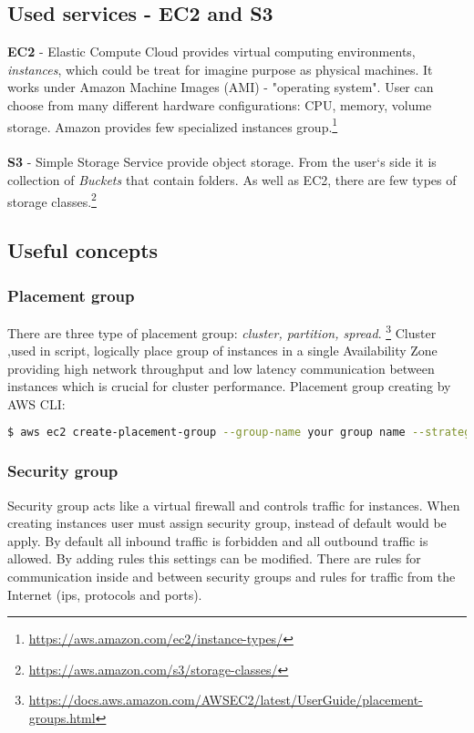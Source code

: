 \documentclass[11pt]{article}
\begin{document}
\subsection{Used services - EC2 and S3}
\textbf{EC2} - Elastic Compute Cloud provides virtual computing environments, \textit{instances}, which could be treat for imagine purpose as physical machines. It works under Amazon Machine Images (AMI) - "operating system". User can choose from many different hardware configurations: CPU, memory, volume storage. Amazon provides few specialized instances group.\footnote{\url{https://aws.amazon.com/ec2/instance-types/}}\\ \\
\textbf{S3} - Simple Storage Service provide object storage. From the user`s side it is collection of \textit{Buckets} that contain folders. As well as EC2, there are few types of storage classes.\footnote{\url{https://aws.amazon.com/s3/storage-classes/}}

\subsection{Useful concepts}
\subsubsection{Placement group}
There are three type of placement group: \textit{cluster, partition, spread}. \footnote{\url{https://docs.aws.amazon.com/AWSEC2/latest/UserGuide/placement-groups.html}} Cluster ,used in script, logically place group of instances in a single Availability Zone providing high network throughput and low latency communication between instances which is crucial for cluster performance. Placement group creating by AWS CLI:

\begin{lstlisting}[language=bash]
$ aws ec2 create-placement-group --group-name your group name --strategy cluster
\end{lstlisting}

\subsubsection{Security group}
Security group acts like a virtual firewall and controls traffic for instances. When creating instances user must assign security group, instead of default would be apply. By default all inbound traffic is forbidden and all outbound traffic is allowed. By adding rules this settings can be modified. There are rules for communication inside and between security groups and rules for traffic from the Internet (ips, protocols and ports). 
\end{document}

